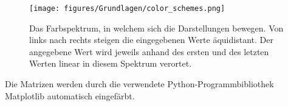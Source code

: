 \begin{figure}[H]
    \centering
    \texttt{[image: figures/Grundlagen/color\_schemes.png]}
    \caption{Das Farbspektrum, in welchem sich die Darstellungen bewegen. Von links nach rechts steigen die eingegebenen Werte äquidistant. Der angegebene Wert wird jeweils anhand des ersten und des letzten Werten linear in diesem Spektrum verortet.}
    \label{fig:color_schemes}
\end{figure}

Die Matrizen werden durch die verwendete Python-Programmbibliothek \glqq{}Matplotlib\grqq{} automatisch eingefärbt.